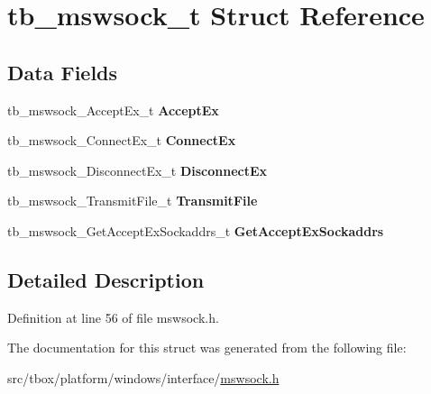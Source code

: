 \hypertarget{structtb__mswsock__t}{\section{tb\-\_\-mswsock\-\_\-t Struct Reference}
\label{structtb__mswsock__t}
}
\subsection*{Data Fields}
\begin{DoxyCompactItemize}
\item 
\hypertarget{structtb__mswsock__t_a7b4dfcc41cef42bda18e840d940a324c}{tb\-\_\-mswsock\-\_\-\-Accept\-Ex\-\_\-t {\bfseries Accept\-Ex}}\label{structtb__mswsock__t_a7b4dfcc41cef42bda18e840d940a324c}

\item 
\hypertarget{structtb__mswsock__t_a7981ad4a97bf6230cb4e6dea9837b41a}{tb\-\_\-mswsock\-\_\-\-Connect\-Ex\-\_\-t {\bfseries Connect\-Ex}}\label{structtb__mswsock__t_a7981ad4a97bf6230cb4e6dea9837b41a}

\item 
\hypertarget{structtb__mswsock__t_ae64653aa22884fcd58ebdec4ea8f2954}{tb\-\_\-mswsock\-\_\-\-Disconnect\-Ex\-\_\-t {\bfseries Disconnect\-Ex}}\label{structtb__mswsock__t_ae64653aa22884fcd58ebdec4ea8f2954}

\item 
\hypertarget{structtb__mswsock__t_aaedb432b32543846c9db36ddbf157320}{tb\-\_\-mswsock\-\_\-\-Transmit\-File\-\_\-t {\bfseries Transmit\-File}}\label{structtb__mswsock__t_aaedb432b32543846c9db36ddbf157320}

\item 
\hypertarget{structtb__mswsock__t_aba5c53f19aac6f9a548537ff16d162d5}{tb\-\_\-mswsock\-\_\-\-Get\-Accept\-Ex\-Sockaddrs\-\_\-t {\bfseries Get\-Accept\-Ex\-Sockaddrs}}\label{structtb__mswsock__t_aba5c53f19aac6f9a548537ff16d162d5}

\end{DoxyCompactItemize}


\subsection{Detailed Description}


Definition at line 56 of file mswsock.\-h.



The documentation for this struct was generated from the following file\-:\begin{DoxyCompactItemize}
\item 
src/tbox/platform/windows/interface/\hyperlink{mswsock_8h}{mswsock.\-h}\end{DoxyCompactItemize}
